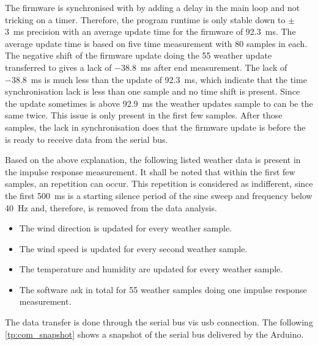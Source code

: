 The firmware is synchronised with \matlab by adding a delay in the main loop and not tricking on a timer. Therefore, the program runtime is only stable down to $\pm$ \SI{3}{\milli\second} precision with an average update time for the firmware of \SI{92.3}{\milli\second}. The average update time is based on five time measurement with 80 samples in each. The negative shift of the firmware update doing the 55 weather update transferred to \matlab gives a lack of \SI{-38.8}{\milli\second} after end measurement.  The lack of \SI{-38.8}{\milli\second} is much less than the update of \SI{92.3}{\milli\second}, which indicate that the time synchronisation lack is less than one sample and no time shift is present. Since the update sometimes is above \SI{92.9}{\milli\second} the weather updates sample to \matlab can be the same twice. This issue is only present in the first few samples. After those samples, the lack in synchronisation does that the firmware update is before the \matlab is ready to receive data from the serial bus.

Based on the above explanation, the following listed weather data is present in the impulse response measurement. It shall be noted that within the first few samples, an repetition can occur. This repetition is considered as indifferent, since the first \SI{500}{\milli\second} is a starting silence period of the sine sweep and frequency below \SI{40}{\hertz} and, therefore, is removed from the data analysis. 

\begin{itemize}
\item The wind direction is updated for every weather sample.  
\item The wind speed is updated for every second weather sample.
\item The temperature and humidity are updated for every weather sample.
\item The \matlab software ask in total for 55 weather samples doing one impulse response measurement. 
\end{itemize}

The data transfer is done through the serial bus vis \gls{usb} connection. The following \autoref{tp:com_snapshot} shows a snapshot of the serial bus delivered by the Arduino.


